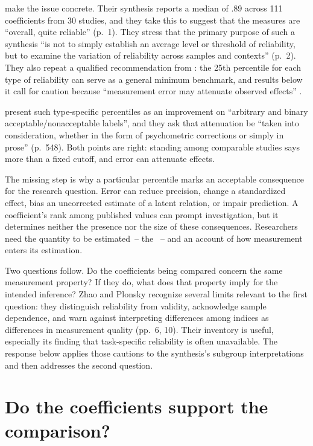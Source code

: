 \documentclass[12pt,twoside]{article}
\begin{document}
\textcite{ZhaoPlonsky2026} make the issue concrete. Their synthesis reports a median of .89 across 111 coefficients from 30 studies, and they take this to suggest that the measures are \enquote{overall, quite reliable} (p.\ 1). They stress that the primary purpose of such a synthesis \enquote{is not to simply establish an average level or threshold of reliability, but to examine the variation of reliability across samples and contexts} (p.\ 2). They also repeat a qualified recommendation from \textcite{PlonskyDerrick2016}: the 25th percentile for each type of reliability can serve as a general minimum benchmark, and results below it call for caution because \enquote{measurement error may attenuate observed effects} \citep[p.\ 7]{ZhaoPlonsky2026}.

\textcite[p.\ 550]{PlonskyDerrick2016} present such type-specific percentiles as an improvement on \enquote{arbitrary and binary acceptable/nonacceptable labels}, and they ask that attenuation be \enquote{taken into consideration, whether in the form of psychometric corrections or simply in prose} (p.\ 548). Both points are right: standing among comparable studies says more than a fixed cutoff, and error can attenuate effects.

The missing step is why a particular percentile marks an acceptable consequence for the research question. Error can reduce precision, change a standardized effect, bias an uncorrected estimate of a latent relation, or impair prediction. A coefficient's rank among published values can prompt investigation, but it determines neither the presence nor the size of these consequences. Researchers need the quantity to be estimated~-- the ~-- and an account of how measurement enters its estimation.

Two questions follow. Do the coefficients being compared concern the same measurement property? If they do, what does that property imply for the intended inference? Zhao and Plonsky recognize several limits relevant to the first question: they distinguish reliability from validity, acknowledge sample dependence, and warn against interpreting differences among indices as differences in measurement quality (pp.\ 6, 10). Their inventory is useful, especially its finding that task-specific reliability is often unavailable. The response below applies those cautions to the synthesis's subgroup interpretations and then addresses the second question.

\section{Do the coefficients support the comparison?}
\end{document}
